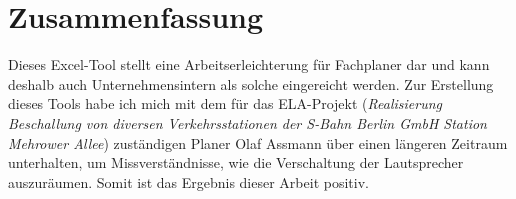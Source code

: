 \chapter{Zusammenfassung}
\label{cha:zusammenfassung}
Dieses Excel-Tool stellt eine Arbeitserleichterung für Fachplaner dar und kann deshalb auch Unternehmensintern als solche eingereicht werden. Zur Erstellung dieses Tools habe ich mich mit dem für das ELA-Projekt (\textit{Realisierung Beschallung von diversen Verkehrsstationen der S-Bahn Berlin GmbH Station Mehrower Allee}) zuständigen Planer Olaf Assmann über einen längeren Zeitraum unterhalten, um Missverständnisse, wie die Verschaltung der Lautsprecher auszuräumen. Somit ist das Ergebnis dieser Arbeit positiv.
